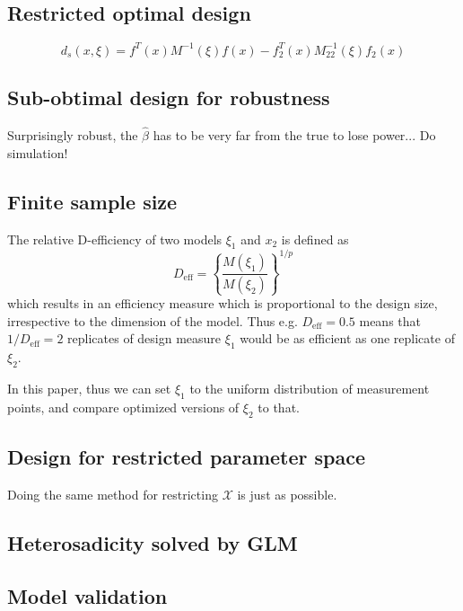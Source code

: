 \documentclass[12pt]{iopart}
\begin{document}
\subsection{Restricted optimal design}

\begin{equation}
d_s(x, \xi) = f^T(x) M^{-1}(\xi)f(x) - f_2^T(x) M_{22}^{-1}(\xi)f_2(x)
\label{eq:dsvar}
\end{equation}

\subsection{Sub-obtimal design for robustness}

Surprisingly robust, the $\hat \beta$ has to be very far from the true to lose power... Do simulation!

\subsection{Finite sample size}

The relative D-efficiency of two models $\xi_1$ and $x_2$ is defined as 
\begin{equation}
D_\mathrm{eff} = \left\{\frac{M(\xi_1)}{M(\xi_2)}\right\}^{1/p}
\end{equation}
which results in an efficiency measure which is proportional to the design size, irrespective to the dimension of the model. Thus e.g. $D_\mathrm{eff} = 0.5$ means that $1 / D_\mathrm{eff} = 2$ replicates of design measure $\xi_1$ would be as efficient as one replicate of $\xi_2$.

In this paper, thus we can set $\xi_1$ to the uniform distribution of measurement points, and compare optimized versions of $\xi_2$ to that.

\subsection{Design for restricted parameter space}

Doing the same method for restricting $\mathcal{X}$ is just as possible. 

\subsection{Heterosadicity solved by GLM}
\subsection{Model validation}
\end{document}
